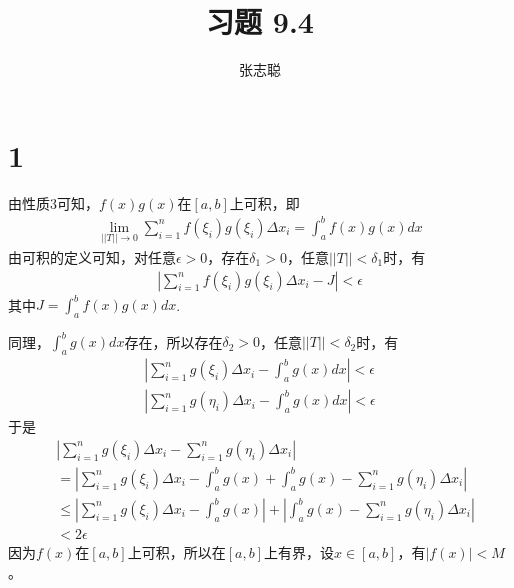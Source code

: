 \documentclass{article}
\begin{document}
\title{习题 9.4}
\author{张志聪}
\maketitle

\section*{1}

由性质3可知，$f(x) g(x)$在$[a,b]$上可积，即
\begin{align*}
  \lim\limits_{||T|| \to 0} \sum\limits_{i=1}^n f(\xi_i) g(\xi_i) \Delta x_i = \int_{a}^{b} f(x) g(x) dx
\end{align*}
由可积的定义可知，对任意$\epsilon > 0$，存在$\delta_1 > 0$，任意$||T|| < \delta_1$时，有
\begin{align*}
  |\sum\limits_{i=1}^n f(\xi_i) g(\xi_i) \Delta x_i - J| < \epsilon
\end{align*}
其中$J = \int_{a}^{b} f(x) g(x) dx$.

同理，$\int_{a}^{b}g(x)dx$存在，所以存在$\delta_2 > 0$，任意$||T|| < \delta_2$时，有
\begin{align*}
  |\sum\limits_{i=1}^n g(\xi_i) \Delta x_i - \int_{a}^{b} g(x) dx| < \epsilon \\
  |\sum\limits_{i=1}^n g(\eta_i) \Delta x_i - \int_{a}^{b} g(x) dx| < \epsilon
\end{align*}
于是
\begin{align*}
   & |\sum\limits_{i=1}^n g(\xi_i) \Delta x_i - \sum\limits_{i=1}^n g(\eta_i) \Delta x_i|                                                \\
   & = |\sum\limits_{i=1}^n g(\xi_i) \Delta x_i - \int_{a}^{b} g(x) + \int_{a}^{b} g(x) - \sum\limits_{i=1}^n g(\eta_i) \Delta x_i|      \\
   & \leq |\sum\limits_{i=1}^n g(\xi_i) \Delta x_i - \int_{a}^{b} g(x)| + |\int_{a}^{b} g(x) - \sum\limits_{i=1}^n g(\eta_i) \Delta x_i| \\
   & < 2\epsilon
\end{align*}
因为$f(x)$在$[a,b]$上可积，所以在$[a,b]$上有界，设$x \in [a,b]$，有$|f(x)|< M$。
\end{document}
